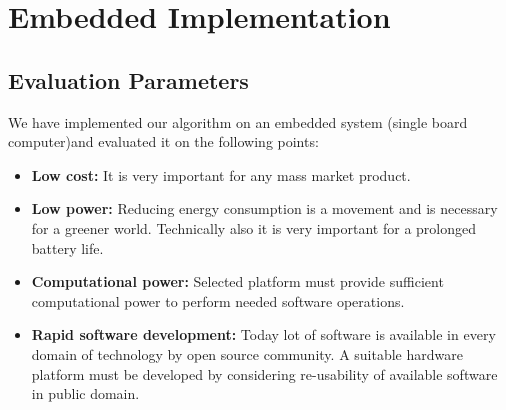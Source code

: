 
\chapter{Embedded Implementation} %
\section {Evaluation Parameters}
\label{Chapter3}
We have implemented our algorithm on an embedded system (single board
computer)and evaluated it on the following points:
\begin{itemize}
 \item \textbf{Low cost:} It is very important for any mass
 market product.
 \item \textbf{Low power:} Reducing energy consumption is a
 movement and is necessary for a greener world.
 Technically also it is very important for a prolonged
 battery life.
 \item \textbf{Computational power:} Selected platform must
 provide sufficient computational power to perform
 needed software operations.
 \item \textbf{Rapid software development:} Today lot of software
 is available in every domain of technology by open source
 community. A suitable hardware platform must be developed by considering
 re-usability of available software in public domain.
\end{itemize}
